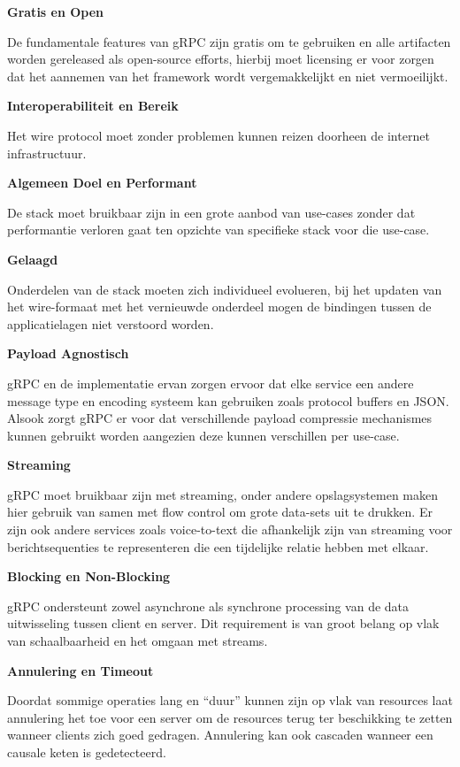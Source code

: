 \textbf{Gratis en Open}

De fundamentale features van gRPC zijn gratis om te gebruiken en  alle artifacten worden gereleased als open-source efforts, hierbij moet licensing er voor zorgen dat het aannemen van het framework wordt vergemakkelijkt en niet vermoeilijkt.

\textbf{Interoperabiliteit en Bereik}

Het wire protocol moet zonder problemen kunnen reizen doorheen de internet infrastructuur.

\textbf{Algemeen Doel en Performant}

De stack moet bruikbaar zijn in een grote aanbod van use-cases zonder dat performantie verloren gaat ten opzichte van specifieke stack voor die use-case.

\textbf{Gelaagd}

Onderdelen van de stack moeten zich individueel evolueren, bij het updaten van het wire-formaat met het vernieuwde onderdeel mogen de bindingen tussen de applicatielagen niet verstoord worden.

\textbf{Payload Agnostisch}

gRPC en de implementatie ervan zorgen ervoor dat elke service  een andere message type en encoding systeem kan gebruiken zoals protocol buffers en JSON. Alsook zorgt gRPC er voor dat verschillende payload compressie mechanismes kunnen gebruikt worden aangezien deze kunnen verschillen per use-case.

\textbf{Streaming}

gRPC moet bruikbaar zijn met streaming, onder andere opslagsystemen maken hier gebruik van samen met flow control om grote data-sets uit te drukken. Er zijn ook andere services zoals voice-to-text die afhankelijk zijn van streaming voor berichtsequenties te representeren die een tijdelijke relatie hebben met elkaar.

\textbf{Blocking en Non-Blocking}

gRPC ondersteunt zowel asynchrone als synchrone processing van de data uitwisseling tussen client en server. Dit requirement is van groot belang op vlak van schaalbaarheid en het omgaan met streams.

\textbf{Annulering en Timeout}

Doordat sommige operaties lang en “duur” kunnen zijn op vlak van resources laat annulering het toe voor een server om de resources terug ter beschikking te zetten wanneer clients zich goed gedragen. Annulering kan ook cascaden wanneer een causale keten is gedetecteerd.

